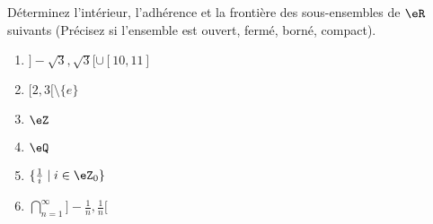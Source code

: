 
\begin{exercice}\label{exo0072}

Déterminez l'intérieur, l'adhérence et la frontière des sous-ensembles de $\eR$ suivants (Précisez si l'ensemble est ouvert, fermé, borné, compact).
\begin{enumerate}
\item $ ]  -\sqrt{3}, \sqrt{3} [ \cup [10, 11] $
\item\label{Item72b} $ [ 2, 3[ \setminus \{ e \} $
\item $ \eZ $
\item $ \eQ $
\item $ \{ \frac{1}{i} \mid i \in \eZ_0 \} $
\item\label{ItemF0072} $ \bigcap_{n = 1}^{ \infty} ] -\frac{1}{n} , \frac{1}{n} [ $
\end{enumerate}

\end{exercice}
